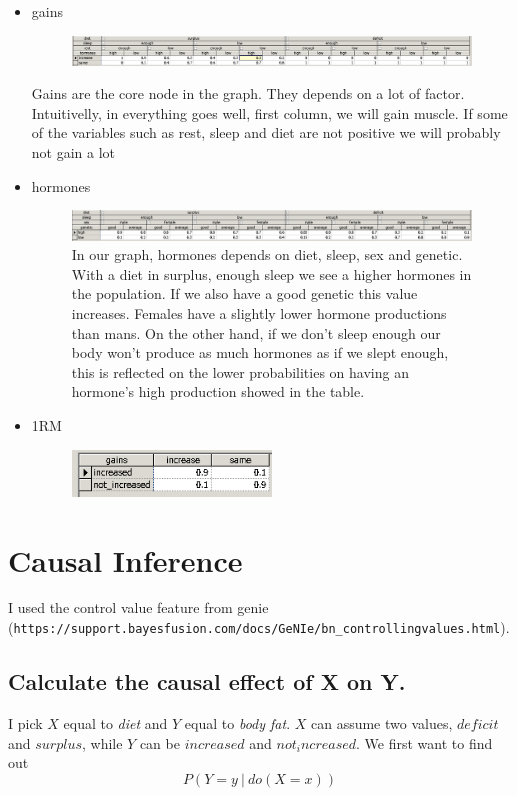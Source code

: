 \documentclass[11pt]{article}
\newcommand\given[1][]{\:#1\vert\:}
\begin{document}
\begin{itemize}
\item gains
\begin{figure}[H]
\includegraphics[width=\textwidth]{./images/nodes/definitions/9.png}
\end{figure}
Gains are the core node in the graph. They depends on a lot of factor. Intuitivelly, in everything goes well, first column, we will gain muscle. If some of the variables such as rest, sleep and diet are not positive we will probably not gain a lot

\item hormones
\begin{figure}[H]
\includegraphics[width=\textwidth]{./images/nodes/definitions/10.png}
In our graph, hormones depends on diet, sleep, sex and genetic. With a diet in surplus, enough sleep we see a higher hormones in the population. If we also have a good genetic this value increases. Females have a slightly lower hormone productions than mans. On the other hand, if we don't sleep enough our body won't produce as much hormones as if we slept enough, this is reflected on the lower probabilities on having an hormone's high production showed in the table.
\end{figure}
\item 1RM 
\begin{figure}[H]
\includegraphics[width=0.5\textwidth]{./images/nodes/definitions/11.png}
\end{figure}
\end{itemize}

\section{Causal Inference}
I used the control value feature from genie (\texttt{https://support.bayesfusion.com/docs/GeNIe/bn\_controllingvalues.html}).
\subsection{Calculate the causal effect of X on Y.}
	I pick $X$ equal to \emph{diet} and $Y$ equal to \emph{body fat}. $X$ can assume two values, $deficit$ and $surplus$, while $Y$ can be $increased$ and $not_increased$. We first want to find out
	\begin{equation}
		P(Y=y \given do(X=x))
	\label{eq:1}
	\end{equation}
	
\end{document}
